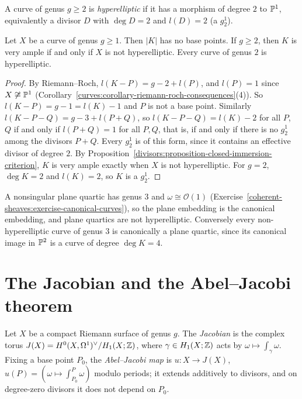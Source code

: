 \begin{definition}\label{curves:definition-hyperelliptic}
A curve of genus $g \geq 2$ is \emph{hyperelliptic} if it has a morphism of degree $2$ to $\mathbb{P}^1$, equivalently a divisor $D$ with $\deg D = 2$ and $l(D) = 2$ (a $g^1_2$).
\end{definition}

\begin{theorem}\label{curves:theorem-canonical}
Let $X$ be a curve of genus $g \geq 1$. Then $|K|$ has no base points. If $g \geq 2$, then $K$ is very ample if and only if $X$ is not hyperelliptic. Every curve of genus $2$ is
hyperelliptic.
\end{theorem}

\begin{proof}
By Riemann--Roch, $l(K - P) = g - 2 + l(P)$, and $l(P) = 1$ since $X \not\cong \mathbb{P}^1$ (Corollary~\ref{curves:corollary-riemann-roch-consequences}(4)). So $l(K - P) = g - 1 = l(K) - 1$
and $P$ is not a base point. Similarly $l(K - P - Q) = g - 3 + l(P + Q)$, so $l(K - P - Q) = l(K) - 2$ for all $P$, $Q$ if and only if $l(P + Q) = 1$ for all $P, Q$, that is, if
and only if there is no $g^1_2$ among the divisors $P + Q$. Every $g^1_2$ is of this form, since it contains an effective divisor of degree $2$. By
Proposition~\ref{divisors:proposition-closed-immersion-criterion}, $K$ is very ample exactly when $X$ is not hyperelliptic. For $g = 2$, $\deg K = 2$ and $l(K) = 2$, so $K$ is a
$g^1_2$.
\end{proof}

\begin{example}\label{curves:example-canonical}
A nonsingular plane quartic has genus $3$ and $\omega \cong \mathcal{O}(1)$ (Exercise~\ref{coherent-sheaves:exercise-canonical-curves}), so the plane embedding is the canonical
embedding, and plane quartics are not hyperelliptic. Conversely every non-hyperelliptic curve of genus $3$ is canonically a plane quartic, since its canonical image
in $\mathbb{P}^2$ is a curve of degree $\deg K = 4$.
\end{example}

\section{The Jacobian and the Abel--Jacobi theorem}\label{curves:section-jacobian}

\begin{definition}\label{curves:definition-jacobian}
Let $X$ be a compact Riemann surface of genus $g$. The \emph{Jacobian} is the complex torus $J(X) = H^0(X, \Omega^1)^\vee/H_1(X; \mathbb{Z})$, where $\gamma \in H_1(X; \mathbb{Z})$ acts by
$\omega \mapsto \int_\gamma\omega$. Fixing a base point $P_0$, the \emph{Abel--Jacobi map} is $u \colon X \to J(X)$, $u(P) = (\omega \mapsto \int_{P_0}^P\omega)$ modulo periods; it
extends additively to divisors, and on degree-zero divisors it does not depend on $P_0$.
\end{definition}

